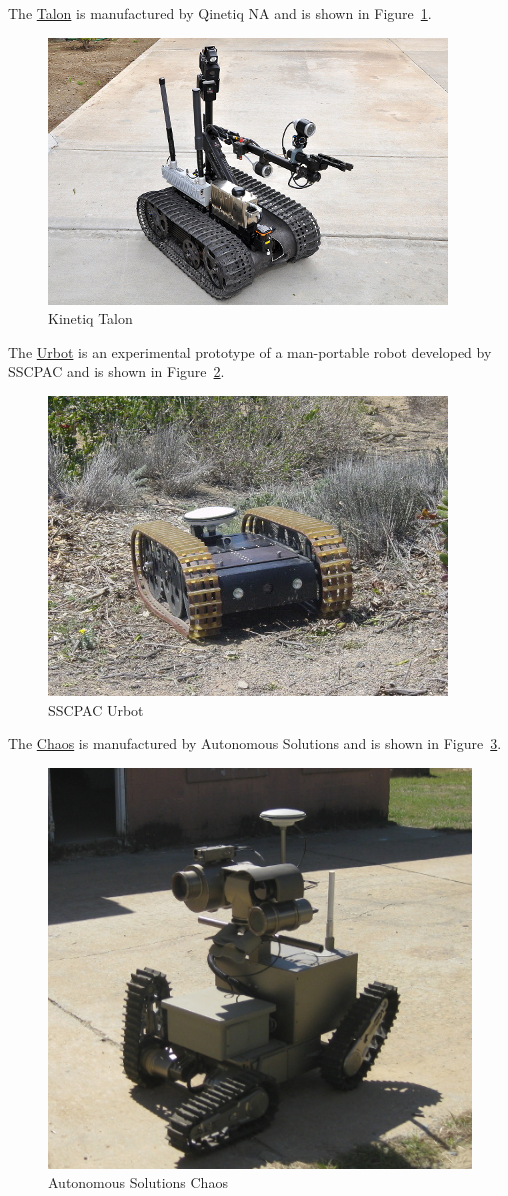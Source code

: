 The \href{http://www.foster-miller.com/lemming.htm}{Talon} is manufactured by Qinetiq NA and is shown in Figure~\ref{fig:talon}.

\begin{figure}[ht!]
\centering
\includegraphics[width=.3\textwidth]{images/talonRetrotraverse}
\caption{Kinetiq Talon}
\label{fig:talon}
\end{figure}

The \href{http://www.spawar.navy.mil/robots/land/mprs/mprs.html}{Urbot} is an experimental prototype of a man-portable robot developed by SSCPAC and is shown in Figure~\ref{fig:urbot}.

\begin{figure}[ht!]
\centering
\includegraphics[width=.3\textwidth]{images/urbotWithGps}
\caption{SSCPAC Urbot}
\label{fig:urbot}
\end{figure}

The \href{http://www.autonomoussolutions.com/products/chaos.php}{Chaos} is manufactured by Autonomous Solutions and is shown in Figure~\ref{fig:chaos}.

\begin{figure}[ht!]
\centering
\includegraphics[width=.3\textwidth]{images/chaos}
\caption{Autonomous Solutions Chaos}
\label{fig:chaos}
\end{figure}

